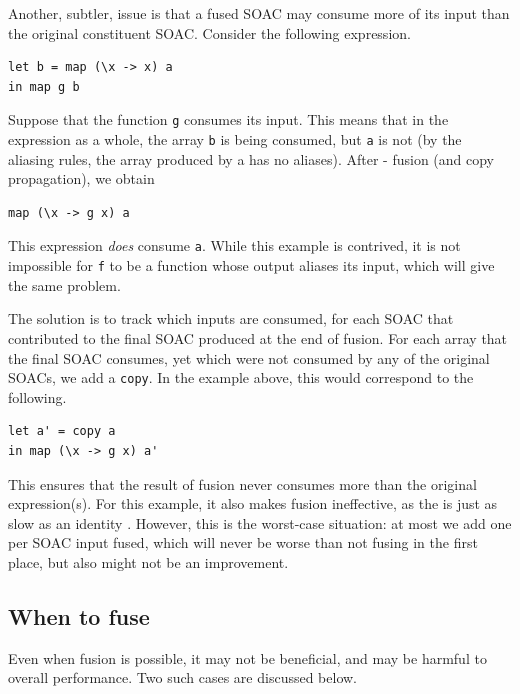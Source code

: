 Another, subtler, issue is that a fused SOAC may consume more of its
input than the original constituent SOAC.  Consider the following
expression.
\begin{lstlisting}
let b = map (\x -> x) a
in map g b
\end{lstlisting}
Suppose that the function \texttt{g} consumes its input.  This means
that in the expression as a whole, the array \texttt{b} is being
consumed, but \texttt{a} is not (by the aliasing rules, the array
produced by a  has no aliases).  After -
fusion (and copy propagation), we obtain
\begin{lstlisting}
map (\x -> g x) a
\end{lstlisting}
This expression \textit{does} consume \texttt{a}.  While this example
is contrived, it is not impossible for \texttt{f} to be a function
whose output aliases its input, which will give the same problem.

The solution is to track which inputs are consumed, for each SOAC that
contributed to the final SOAC produced at the end of fusion.  For each
array that the final SOAC consumes, yet which were not consumed by any
of the original SOACs, we add a \texttt{copy}.  In the example above,
this would correspond to the following.
\begin{lstlisting}
let a' = copy a
in map (\x -> g x) a'
\end{lstlisting}%
This ensures that the result of fusion never consumes more than the
original expression(s).  For this example, it also makes fusion
ineffective, as the  is just as slow as an identity .
However, this is the worst-case situation: at most we add one 
per SOAC input fused, which will never be worse than not fusing in the
first place, but also might not be an improvement.

\subsection{When to fuse}
\label{sec:whentofuse}

Even when fusion is possible, it may not be beneficial, and may be
harmful to overall performance.  Two such cases are discussed below.

